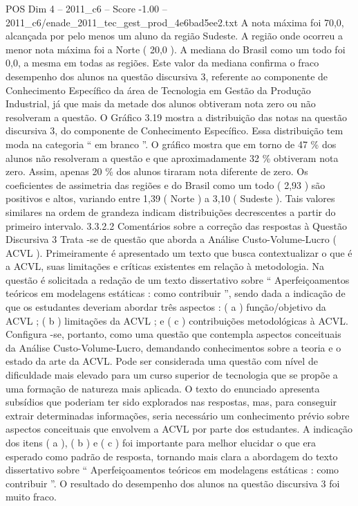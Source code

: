 \begin{textsample}{POS Dim 4 – 2011\_c6 – Score -1.00 – 2011\_c6/enade\_2011\_tec\_gest\_prod\_4e6bad5ee2.txt}
A nota máxima foi 70,0, alcançada por pelo menos um aluno da região Sudeste.
A região onde ocorreu a menor nota máxima foi a Norte ( 20,0 ).
A mediana do Brasil como um todo foi 0,0, a mesma em todas as regiões.
Este valor da mediana confirma o fraco desempenho dos alunos na questão discursiva 3, referente ao componente de Conhecimento Específico da área de Tecnologia em Gestão da Produção Industrial, já que mais da metade dos alunos obtiveram nota zero ou não resolveram a questão.
O Gráfico 3.19 mostra a distribuição das notas na questão discursiva 3, do componente de Conhecimento Específico.
Essa distribuição tem moda na categoria “ em branco ”.
O gráfico mostra que em torno de 47 \% dos alunos não resolveram a questão e que aproximadamente 32 \% obtiveram nota zero.
Assim, apenas 20 \% dos alunos tiraram nota diferente de zero.
Os coeficientes de assimetria das regiões e do Brasil como um todo ( 2,93 ) são positivos e altos, variando entre 1,39 ( Norte ) a 3,10 ( Sudeste ).
Tais valores similares na ordem de grandeza indicam distribuições decrescentes a partir do primeiro intervalo. 3.3.2.2 Comentários sobre a correção das respostas à Questão Discursiva 3 Trata -se de questão que aborda a Análise Custo-Volume-Lucro ( ACVL ).
Primeiramente é apresentado um texto que busca contextualizar o que é a ACVL, suas limitações e críticas existentes em relação à metodologia.
Na questão é solicitada a redação de um texto dissertativo sobre “ Aperfeiçoamentos teóricos em modelagens estáticas : como contribuir ”, sendo dada a indicação de que os estudantes deveriam abordar três aspectos : ( a ) função/objetivo da ACVL ; ( b ) limitações da ACVL ; e ( c ) contribuições metodológicas à ACVL.
Configura -se, portanto, como uma questão que contempla aspectos conceituais da Análise Custo-Volume-Lucro, demandando conhecimentos sobre a teoria e o estado da arte da ACVL.
Pode ser considerada uma questão com nível de dificuldade mais elevado para um curso superior de tecnologia que se propõe a uma formação de natureza mais aplicada.
O texto do enunciado apresenta subsídios que poderiam ter sido explorados nas respostas, mas, para conseguir extrair determinadas informações, seria necessário um conhecimento prévio sobre aspectos conceituais que envolvem a ACVL por parte dos estudantes.
A indicação dos itens ( a ), ( b ) e ( c ) foi importante para melhor elucidar o que era esperado como padrão de resposta, tornando mais clara a abordagem do texto dissertativo sobre “ Aperfeiçoamentos teóricos em modelagens estáticas : como contribuir ”.
O resultado do desempenho dos alunos na questão discursiva 3 foi muito fraco.

\end{textsample}
